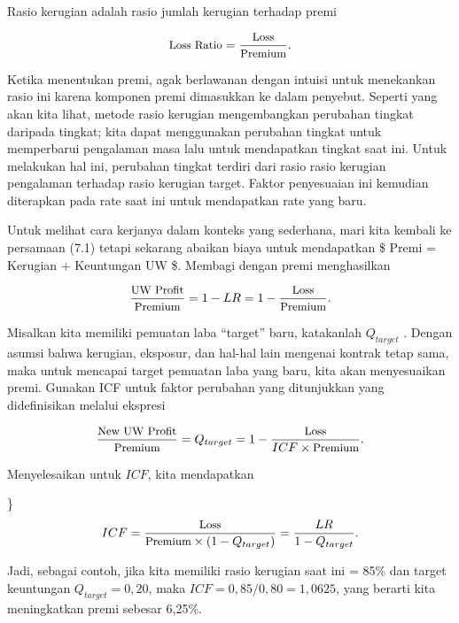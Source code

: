 \documentclass[
]{book}
\begin{document}
Rasio kerugian adalah rasio jumlah kerugian terhadap premi

\begin{equation}
\small{
\text{Loss Ratio} = \frac{\text{Loss}}{\text{Premium}} .
}
\end{equation}

Ketika menentukan premi, agak berlawanan dengan intuisi untuk menekankan rasio ini karena komponen premi dimasukkan ke dalam penyebut. Seperti yang akan kita lihat, metode rasio kerugian mengembangkan perubahan tingkat daripada tingkat; kita dapat menggunakan perubahan tingkat untuk memperbarui pengalaman masa lalu untuk mendapatkan tingkat saat ini. Untuk melakukan hal ini, perubahan tingkat terdiri dari rasio rasio kerugian pengalaman terhadap rasio kerugian target. Faktor penyesuaian ini kemudian diterapkan pada rate saat ini untuk mendapatkan rate yang baru.

Untuk melihat cara kerjanya dalam konteks yang sederhana, mari kita kembali ke persamaan (7.1) tetapi sekarang abaikan biaya untuk mendapatkan \$ Premi = Kerugian + Keuntungan UW \$. Membagi dengan premi menghasilkan

\begin{equation}
\small{
\frac{\text{UW Profit}}{\text{Premium}} = 1 - LR = 1 - \frac{\text{Loss}}{\text{Premium}} .
}
\end{equation}

Misalkan kita memiliki pemuatan laba ``target'' baru, katakanlah \(Q_{target}\) . Dengan asumsi bahwa kerugian, eksposur, dan hal-hal lain mengenai kontrak tetap sama, maka untuk mencapai target pemuatan laba yang baru, kita akan menyesuaikan premi. Gunakan ICF untuk faktor perubahan yang ditunjukkan yang didefinisikan melalui ekspresi

\begin{equation}
\small{
\frac{\text{New UW Profit}}{\text{Premium}} = Q_{target} =  1 - \frac{\text{Loss}}{ICF \times \text{Premium}}.
}
\end{equation}

Menyelesaikan untuk \(ICF\), kita mendapatkan

\}\begin{equation}
\small{
ICF =  \frac{\text{Loss}}{\text{Premium} \times (1-Q_{target})} = \frac{LR}{1-Q_{target}}.
}
\end{equation}

Jadi, sebagai contoh, jika kita memiliki rasio kerugian saat ini = 85\% dan target keuntungan \(Q_{target} = 0,20\), maka \(ICF = 0,85/0,80 = 1,0625\), yang berarti kita meningkatkan premi sebesar 6,25\%.
\end{document}

